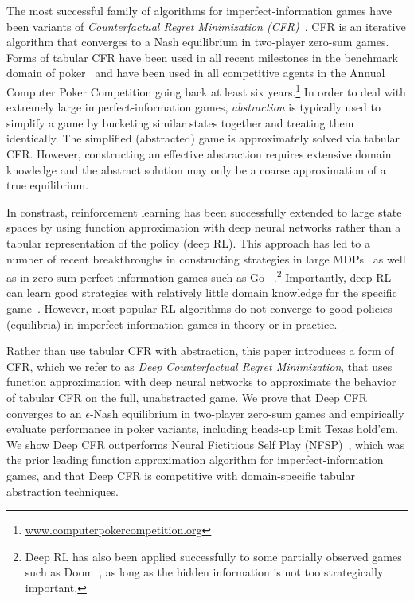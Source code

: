 \documentclass{article}
\begin{document}
The most successful family of algorithms for imperfect-information games have been variants of \emph{Counterfactual Regret Minimization (CFR)}~\cite{Zinkevich07:Regret}. CFR is an iterative algorithm that converges to a Nash equilibrium in two-player zero-sum games. Forms of tabular CFR have been used in all recent milestones in the benchmark domain of poker~\cite{Bowling15:Heads-up,Moravcik17:DeepStack,Brown17:Superhuman} and have been used in all competitive agents in the Annual Computer Poker Competition going back at least six years.\footnote{\href{www.computerpokercompetition.org}{www.computerpokercompetition.org}} In order to deal with extremely large imperfect-information games, \emph{abstraction} is typically used to simplify a game by bucketing similar states together and treating them identically. The simplified (abstracted) game is approximately solved via tabular CFR. However, constructing an effective abstraction requires extensive domain knowledge and the abstract solution may only be a coarse approximation of a true equilibrium.

In constrast, reinforcement learning has been successfully extended to large state spaces by using function approximation with deep neural networks rather than a tabular representation of the policy (deep RL). This approach has led to a number of recent breakthroughs in constructing strategies in large MDPs~\cite{Mnih15:Human} as well as in zero-sum perfect-information games such as Go~ \cite{Silver17:Mastering,Silver18:General}.\footnote{Deep RL has also been applied successfully to some partially observed games such as Doom~\cite{lample2017playing}, as long as the hidden information is not too strategically important.} Importantly, deep RL can learn good strategies with relatively little domain knowledge for the specific game~\cite{Silver17:Mastering}.
However, most popular RL algorithms do not converge to good policies (equilibria) in imperfect-information games in theory or in practice.

Rather than use tabular CFR with abstraction, this paper introduces a form of CFR, which we refer to as \emph{Deep Counterfactual Regret Minimization}, that uses function approximation with deep neural networks to approximate the behavior of tabular CFR on the full, unabstracted game. We prove that Deep CFR converges to an $\epsilon$-Nash equilibrium in two-player zero-sum games and empirically evaluate performance in poker variants, including heads-up limit Texas hold'em. We show Deep CFR outperforms Neural Fictitious Self Play (NFSP)~\cite{Heinrich16:Deep}, which was the prior leading function approximation algorithm for imperfect-information games, and that Deep CFR is competitive with domain-specific tabular abstraction techniques.
\end{document}

